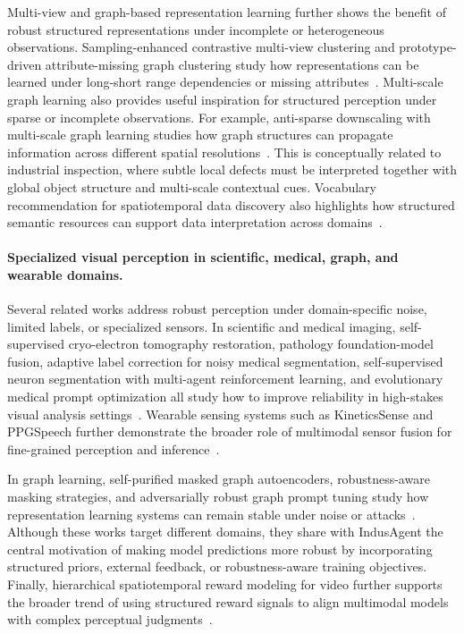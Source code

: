\documentclass{llmxive}
\begin{document}
{Multi-view and graph-based representation learning further shows the benefit of robust structured representations under incomplete or heterogeneous observations. Sampling-enhanced contrastive multi-view clustering and prototype-driven attribute-missing graph clustering study how representations can be learned under long-short range dependencies or missing attributes~\citep{SEC-LSRM, PAGC}. Multi-scale graph learning also provides useful inspiration for structured perception under sparse or incomplete observations. For example, anti-sparse downscaling with multi-scale graph learning studies how graph structures can propagate information across different spatial resolutions~\citep{fan2025multi}. This is conceptually related to industrial inspection, where subtle local defects must be interpreted together with global object structure and multi-scale contextual cues. Vocabulary recommendation for spatiotemporal data discovery also highlights how structured semantic resources can support data interpretation across domains~\citep{cui2019vocabulary}.

\paragraph{Specialized visual perception in scientific, medical, graph, and wearable domains.}
Several related works address robust perception under domain-specific noise, limited labels, or specialized sensors. In scientific and medical imaging, self-supervised cryo-electron tomography restoration, pathology foundation-model fusion, adaptive label correction for noisy medical segmentation, self-supervised neuron segmentation with multi-agent reinforcement learning, and evolutionary medical prompt optimization all study how to improve reliability in high-stakes visual analysis settings~\citep{Yang_2021_ICCV, yang2025fusionmultiscaleheterogeneouspathology, qian2025adaptive, chen2023self, chen2026empower}. Wearable sensing systems such as KineticsSense and PPGSpeech further demonstrate the broader role of multimodal sensor fusion for fine-grained perception and inference~\citep{10.1145/3749462, 11271667}. 

In graph learning, self-purified masked graph autoencoders, robustness-aware masking strategies, and adversarially robust graph prompt tuning study how representation learning systems can remain stable under noise or attacks~\citep{song2025spmgae, song2025equipping, song2025gpromptshield}. Although these works target different domains, they share with IndusAgent the central motivation of making model predictions more robust by incorporating structured priors, external feedback, or robustness-aware training objectives. Finally, hierarchical spatiotemporal reward modeling for video further supports the broader trend of using structured reward signals to align multimodal models with complex perceptual judgments~\citep{wang2026cac}.
  
}
\end{document}
